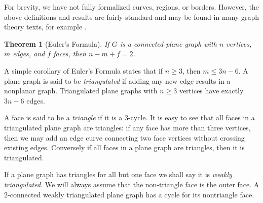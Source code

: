 \documentclass[letterpaper, 12pt]{article}
\theoremstyle{thm}
\newtheorem{theorem}{Theorem}[section]
\begin{document}
For brevity, we have
not fully formalized curves, regions, or borders. However, the
above definitions and results are fairly standard and may be found in many graph
theory texts, for example \cite{west}.

\begin{theorem}[Euler's Formula]
If $G$ is a connected plane graph with $n$ vertices, $m$ edges, and $f$ faces,
then $n-m+f=2$.
\end{theorem}

A simple corollary of Euler's Formula states that if $n\ge 3$, then $m\le 3n-6$.
A plane graph is said to be \textit{triangulated} if adding any new edge
results in a nonplanar graph. Triangulated plane graphs with $n\ge 3$ vertices
have exactly $3n-6$ edges.

A face is said to be a \textit{triangle} if it is a
$3$-cycle. It is easy to see that all faces in a triangulated
plane graph are triangles: if any face has more than three vertices, then we may
add an edge curve connecting two face vertices without crossing existing edges.
Conversely if all faces in a plane graph are triangles, then it is triangulated.

\begin{comment}
\begin{figure}
\begin{tikzpicture}
	\node (a) at (0.75cm,0.75cm) {};
	\node (b) at (0.75cm,-0.75cm) {};
	\node (c) at (-0.75cm,-0.75cm) {};
	\node (d) at (-0.75cm,0.75cm) {};
	\node [draw=none, fill=none] (1) at (0cm,-1cm) {};
	\node [draw=none, fill=none] (2) at (0cm,1cm) {};
	\draw (a) -- (b) -- (c) -- (d) -- (a);
	\draw (a) -- (c); \draw (b) -- (d);
\end{tikzpicture}
$\qquad$
\begin{tikzpicture}
	\node (a) at (0cm,0.75cm) {};
	\node (b) at (0.866cm,-0.75cm) {};
	\node (c) at (-0.866cm,-0.75cm) {};
	\node (d) at (0cm, -0.18cm) {};
	\node [draw=none, fill=none] (1) at (0cm,-1cm) {};
	\node [draw=none, fill=none] (2) at (0cm,1cm) {};
	\draw (a) -- (b) -- (c) -- (d) -- (a);
	\draw (a) -- (c); \draw (b) -- (d);
\end{tikzpicture}

\caption{A nonplanar drawing and a planar embedding of $K_4$.}
\end{figure}
\end{comment}

If a plane graph has triangles for all but one face we shall say it is
\textit{weakly triangulated}. We will always assume that the non-triangle face is the
outer face. A $2$-connected weakly triangulated plane graph has a cycle for its
nontriangle face.
\end{document}
